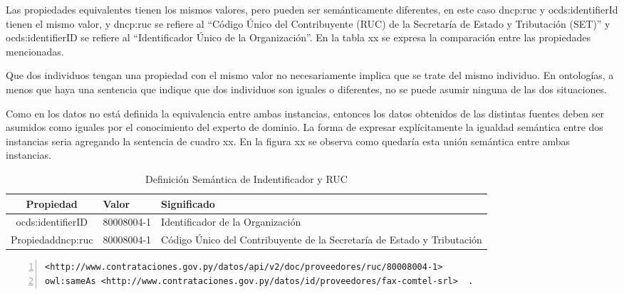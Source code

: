  Las propiedades equivalentes tienen los mismos valores, pero pueden ser semánticamente diferentes, en este caso dncp:ruc y ocds:identifierId tienen el mismo valor, y dncp:ruc se refiere al “Código Único del Contribuyente (RUC) de la Secretaría de Estado y Tributación (SET)” y ocds:identifierID se refiere al “Identificador Único de la Organización”. En la tabla xx se expresa la comparación entre las propiedades mencionadas.

 Que dos individuos tengan una propiedad con el mismo valor no necesariamente implica que se trate del mismo individuo. En ontologías, a menos que haya una sentencia que indique que dos individuos son iguales o diferentes, no se puede asumir ninguna de las dos situaciones. 

 Como en los datos no está definida la equivalencia entre ambas instancias, entonces los datos obtenidos de las distintas fuentes deben ser asumidos como iguales por el conocimiento del experto de dominio. La forma de expresar explícitamente la igualdad semántica entre dos instancias seria agregando la sentencia de cuadro xx. En la figura xx se observa como quedaría esta unión semántica entre ambas instancias.
 


 \begin{table}[tbp]
    \centering
    \caption{Definición Semántica de Indentificador y RUC}
    \label{table:semanticaID}
    \resizebox{15cm}{!} {
    \begin{tabular}{|c|l|l|}
    \hline
    
Propiedad & Valor &  Significado \\ \hline

ocds:identifierID  & 80008004-1 &  Identificador de la Organización \\ \hline
Propiedaddncp:ruc & 80008004-1 &  Código Único del Contribuyente de la Secretaría de Estado y Tributación \\ \hline

    \end{tabular}
    }
    \end{table}



    \begin{lstlisting}[captionpos=b, caption=Información referente al proceso licitatorio cuyo identificacor es, label=lst:caso-3,  numbers=left,  numberstyle=\tiny\color{mygray},
        basicstyle=\tiny,frame=single]
<http://www.contrataciones.gov.py/datos/api/v2/doc/proveedores/ruc/80008004-1> 
owl:sameAs <http://www.contrataciones.gov.py/datos/id/proveedores/fax-comtel-srl>  .

     \end{lstlisting}

